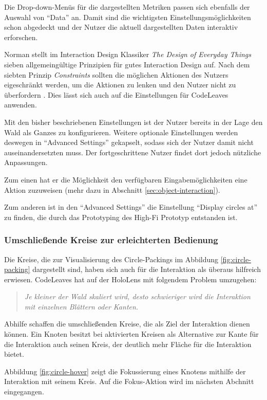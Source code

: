 Die Drop-down-Menüs für die dargestellten Metriken passen sich ebenfalls der Auswahl von "`Data"' an. Damit sind die wichtigsten Einstellungsmöglichkeiten schon abgedeckt und der Nutzer die aktuell dargestellten Daten interaktiv erforschen.

Norman stellt im Interaction Design Klassiker \textit{The Design of Everyday Things} sieben allgemeingültige Prinzipien für gutes Interaction Design auf. Nach dem siebten Prinzip \textit{Constraints} sollten die möglichen Aktionen des Nutzers eigeschränkt werden, um die Aktionen zu lenken und den Nutzer nicht zu überfordern \cite{norman2013design}. Dies lässt sich auch auf die Einstellungen für CodeLeaves anwenden.

Mit den bisher beschriebenen Einstellungen ist der Nutzer bereits in der Lage den Wald als Ganzes zu konfigurieren. Weitere optionale Einstellungen werden deswegen in "`Advanced Settings"' gekapselt, sodass sich der Nutzer damit nicht auseinandersetzten muss. Der fortgeschrittene Nutzer findet dort jedoch nützliche Anpassungen.

Zum einen hat er die Möglichkeit den verfügbaren Eingabemöglichkeiten eine Aktion zuzuweisen (mehr dazu in Abschnitt \ref{sec:object-interaction}).

Zum anderen ist in den "`Advanced Settings"' die Einstellung "`Display circles at"' zu finden, die durch das Prototyping des High-Fi Prototyp entstanden ist.

\subsubsection*{Umschließende Kreise zur erleichterten Bedienung}
Die Kreise, die zur Visualisierung des Circle-Packings im Abbildung \ref{fig:circle-packing} dargestellt sind, haben sich auch für die Interaktion als überaus hilfreich erwiesen. CodeLeaves hat auf der HoloLens mit folgendem Problem umzugehen:

\begin{quote}
  \textit{Je kleiner der Wald skaliert wird, desto schwieriger wird die Interaktion mit einzelnen Blättern oder Kanten.}
\end{quote}

Abhilfe schaffen die umschließenden Kreise, die als Ziel der Interaktion dienen können. Ein Knoten besitzt bei aktivierten Kreisen als Alternative zur Kante für die Interaktion auch seinen Kreis, der deutlich mehr Fläche für die Interaktion bietet.

Abbildung \ref{fig:circle-hover} zeigt die Fokussierung eines Knotens mithilfe der Interaktion mit seinem Kreis. Auf die Fokus-Aktion wird im nächsten Abchnitt eingegangen.
 
